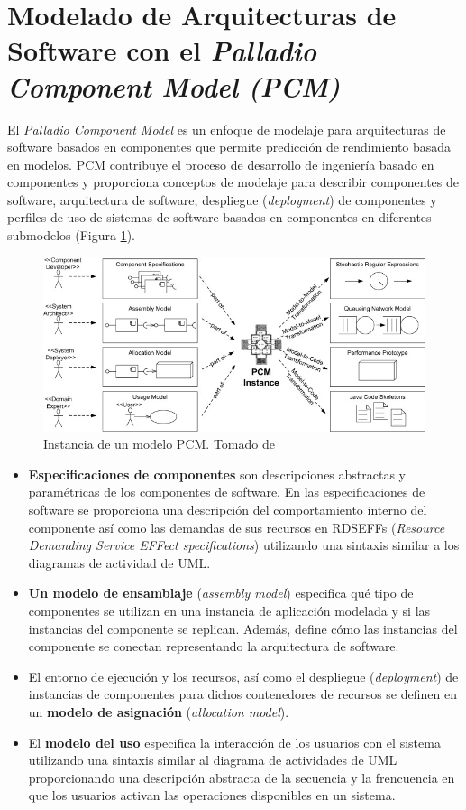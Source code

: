 \documentclass[11pt, twoside]{report}
\begin{document}
\section{Modelado de Arquitecturas de Software con el \emph{Palladio Component Model (PCM)}}
El \emph{Palladio Component Model} es un enfoque de modelaje para arquitecturas de software basados en componentes que permite predicción de rendimiento basada en modelos. PCM contribuye el proceso de desarrollo de ingeniería basado en componentes y proporciona conceptos de modelaje para describir componentes de software, arquitectura de software, despliegue (\emph{deployment}) de componentes y perfiles de uso de sistemas de software basados en componentes en diferentes submodelos (Figura \ref{fig:pcm-instance}). 

\begin{figure}[h]
  \centering
  \includegraphics[width=15cm]{palladio-cbse-process}
  \caption{\small{Instancia de un modelo PCM. Tomado de \cite{happe-et-al}}}
  \label{fig:pcm-instance}
\end{figure}

\begin{itemize}
    \item \textbf{Especificaciones de componentes} son descripciones abstractas y paramétricas de los componentes de software. En las especificaciones de software se proporciona una descripción del comportamiento interno del componente así como las demandas de sus recursos en RDSEFFs (\emph{Resource Demanding Service EFFect specifications}) utilizando una sintaxis similar a los diagramas de actividad de UML.
    \item \textbf{Un modelo de ensamblaje} (\emph{assembly model}) especifica qué tipo de componentes se utilizan en una instancia de aplicación modelada y si las instancias del componente se replican. Además, define cómo las instancias del componente se conectan representando la arquitectura de software.
    \item El entorno de ejecución y los recursos, así como el despliegue (\emph{deployment}) de instancias de componentes para dichos contenedores de recursos se definen en un \textbf{modelo de asignación} (\emph{allocation model}).
    \item El \textbf{modelo del uso} especifica la interacción de los usuarios con el sistema utilizando una sintaxis similar al diagrama de actividades de UML proporcionando una descripción abstracta de la secuencia y la frencuencia en que los usuarios activan las operaciones disponibles en un sistema.
\end{itemize}
\end{document}
